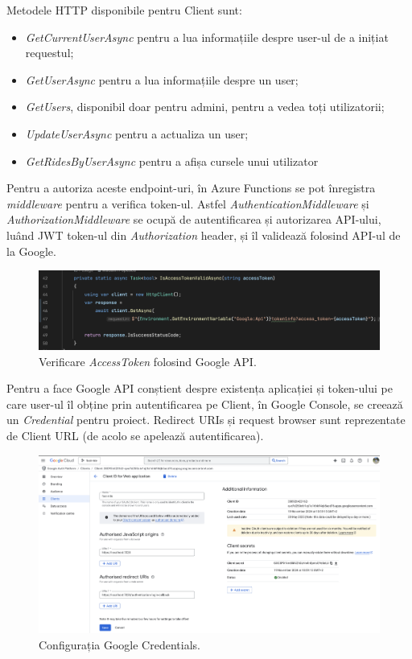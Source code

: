 Metodele HTTP disponibile pentru Client sunt:
\begin{itemize}
    \item \textit{GetCurrentUserAsync} pentru a lua informațiile despre user-ul de a inițiat requestul;
    \item \textit{GetUserAsync} pentru a lua informațiile despre un user;
    \item \textit{GetUsers}, disponibil doar pentru admini, pentru a vedea toți utilizatorii;
    \item \textit{UpdateUserAsync} pentru a actualiza un user;
    \item \textit{GetRidesByUserAsync} pentru a afișa cursele unui utilizator
\end{itemize}

Pentru a autoriza aceste endpoint-uri, în Azure Functions se pot înregistra \textit{middleware} pentru 
a verifica token-ul. Astfel \textit{AuthenticationMiddleware} și \textit{AuthorizationMiddleware} se ocupă de autentificarea 
și autorizarea API-ului, luând JWT token-ul din \textit{Authorization} header, și îl validează
folosind API-ul de la Google.

\begin{figure}[H]
    \centering
    \includegraphics[width=14cm]{Assets/GoogleAuthorization.png}
    \caption{Verificare \textit{AccessToken} folosind Google API.}
    \label{fig:GoogleAuthorization}
\end{figure}

Pentru a face Google API conștient despre existența aplicației și token-ului pe care user-ul îl obține
prin autentificarea pe Client, în Google Console, se creează un \textit{Credential} pentru proiect.
Redirect URIs și request browser sunt reprezentate de Client URL (de acolo se apelează autentificarea).

\begin{figure}[H]
    \centering
    \includegraphics[width=14cm]{Assets/GoogleConfig.png}
    \caption{Configurația Google Credentials.}
    \label{fig:GoogleConfig}
\end{figure}

